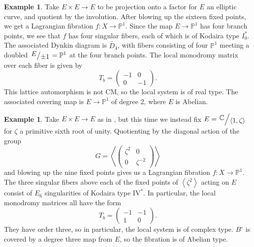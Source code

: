 \documentclass[12pt]{amsart}
\newcommand{\C}{\mathbb{C}}
\newcommand{\rightQ}[2]{\left.\raisebox{.2em}{$#1$}\middle/\raisebox{-.2em}{$#2$}\right.}
\theoremstyle{definition}
\newtheorem{example}[theorem]{Example}
\theoremstyle{remark}
\numberwithin{equation}{section}
\begin{document}
\begin{example} \label{example-Kummer-real}
Take \(E \times E \to E\) to be projection onto a factor for \(E\) an elliptic curve, 
and quotient by
the involution. After blowing up the sixteen fixed points, we get a Lagrangian 
fibration \(f: X \to \mathbb{P}^1\). Since the map \(E \to \mathbb{P}^1\) has
four branch points, we see that \(f\) has four singular fibers, each of which is
of Kodaira type \(I_0^*\). The associated Dynkin diagram is \(\widetilde{D_4}\),
with fibers consisting of four \(\mathbb{P}^1\) meeting a doubled 
\(\rightQ{E}{\pm 1} = \mathbb{P}^1\)
at the four branch points. The local monodromy matrix over each fiber is given by
\begin{equation}
    T_b = \begin{pmatrix}
        -1 & 0 \\ 0 & -1
    \end{pmatrix}.
\end{equation}
This lattice automorphism is not CM, so the local system is of real type.
The associated covering map is \(E \to \mathbb{P}^1\) of degree 2, where
\(E\) is Abelian.
\end{example}

\begin{example} \label{example-Kummer-complex-1}
Take \(E \times E \to E\) as in , but this time we
instead fix \(E = \rightQ{\C}{\left<1, \zeta\right>}\) for \(\zeta\) a primitive
sixth root of unity. Quotienting by the diagonal action of the group
\begin{equation}
    G = \left<\begin{pmatrix}
        \zeta^2 & 0 \\ 0 & \zeta^{-2}
    \end{pmatrix}\right>
\end{equation}
and blowing up the nine fixed points gives us a Lagrangian fibration 
\(f: X \to \mathbb{P}^1\). The three singular fibers above each of the fixed points
of \(\left<\zeta^2\right>\) acting on \(E\) consist of \(E_6\) singularities of Kodaira
type \(\text{IV}^*\). In particular, the local monodromy matrices all have the form
\begin{equation*}
    T_b = \begin{pmatrix}
        -1 & -1 \\ 1 & 0
    \end{pmatrix}.
\end{equation*}
They have order three, so in particular, the local system is of complex type. \(B^\circ\) 
is covered by a degree three map from \(E\), so the fibration is of Abelian type.
\end{example}
\end{document}
